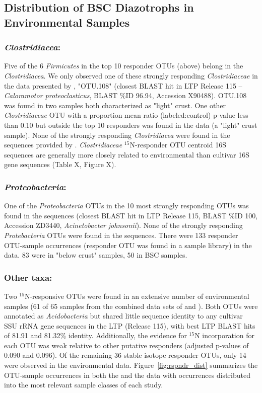 \subsection{Distribution of BSC Diazotrophs in Environmental Samples}
\subsubsection{\textbf{\textit{Clostridiacea}:}} Five of the 6
\textit{Firmicutes} in the top 10 responder OTUs (above) belong in the
\textit{Clostridiacea}. We only observed one of these strongly responding
\textit{Clostridiaceae} in the data presented by \citet{Garcia_Pichel_2013},
"OTU.108" (closest BLAST hit in LTP Release 115 -- \textit{Caloramotor
proteoclasticus}, BLAST \%ID 96.94, Accession X90488).  OTU.108 was found in
two samples both characterized as "light" crust. One other
\textit{Clostridiaceae} OTU with a proportion mean ratio (labeled:control)
p-value less than 0.10 but outside the top 10 responders was found in the
\citet{Garcia_Pichel_2013} data (a "light" crust sample). None of
the strongly responding \textit{Clostridiacea} were found in the sequences
provided by \citet{Steven_2013}. \textit{Clostridiaceae} $^{15}$N-responder OTU
centroid 16S sequences are generally more closely related to environmental than
cultivar 16S gene sequences (Table X, Figure X).   

\subsubsection{\textbf{\textit{Proteobacteria}:}} One of the
\textit{Proteobacteria} OTUs in the 10 most strongly responding OTUs was
found in the \citet{Garcia_Pichel_2013} sequences (closest
BLAST hit in LTP Release 115, BLAST \%ID 100, Accession ZD3440,
\textit{Acinetobacter johnsonii}). None of the strongly responding
\textit{Protebacteria} OTUs were found in the \citet{Steven_2013} sequences.
There were 133 responder OTU-sample occurrences (responder OTU was found in a
sample library) in the \citet{Steven_2013} data.  83 were in "below crust"
samples, 50 in BSC samples.

\subsubsection{\textbf{Other taxa:}} Two $^{15}$N-responsive OTUs were found
in an extensive number of environmental samples (61 of 65 samples from the
combined data sets of \citet{Garcia_Pichel_2013} and \citet{Steven_2013}).
Both OTUs were annotated as \textit{Acidobacteria} but shared little sequence
identity to any cultivar SSU rRNA gene sequences in the LTP (Release 115),
with best LTP BLAST hits of 81.91 and 81.32\% identity. Additionally, the
evidence for $^{15}$N incorporation for each OTU was weak relative to other
putative responders (adjusted p-values of 0.090 and 0.096). Of the remaining
36 stable isotope responder OTUs, only 14 were observed in the environmental
data.  Figure~\ref{fig:rspndr_dist} summarizes the OTU-sample occurrences in
both the \citet{Steven_2013} and the \citet{Garcia_Pichel_2013} data with
occurrences distributed into the most relevant sample classes of each study.

